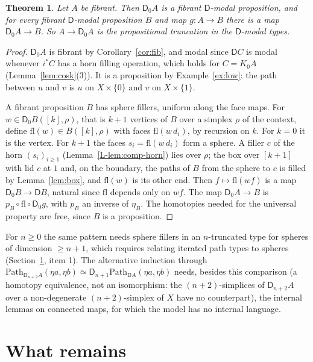 \documentclass[11pt]{article}
\newcommand{\Path}{\mathrm{Path}}
\newcommand{\D}{\mathsf{D}}
\theoremstyle{plain}
\newtheorem{theorem}{Theorem}[section]
\theoremstyle{definition}
\theoremstyle{remark}
\begin{document}
\begin{theorem}\label{thm:prop}
Let $A$ be fibrant. Then $\D_0A$ is a fibrant $\D$-modal proposition, and
for every fibrant $\D$-modal proposition $B$ and map $g:A\to B$ there is a
map $\D_0A\to B$. So $A\to\D_0A$ is the propositional truncation in the
$\D$-modal types.
\end{theorem}

\begin{proof}
$\D_0A$ is fibrant by Corollary~\ref{cor:fib}, and modal since $\D C$ is
modal whenever $i^*C$ has a horn filling operation, which holds for
$C=K_0A$ (Lemma~\ref{lem:cosk}(3)). It is a proposition by
Example~\ref{ex:low}: the path between $u$ and $v$ is $u$ on $X\times\{0\}$
and $v$ on $X\times\{1\}$.

A fibrant proposition $B$ has sphere fillers, uniform along the face maps.
For $w\in\D_0B([k],\rho)$, that is $k+1$ vertices of $B$ over a simplex
$\rho$ of the context, define $\mathrm{fl}(w)\in B([k],\rho)$ with faces
$\mathrm{fl}(w\,d_i)$, by recursion on $k$. For $k=0$ it is the vertex. For
$k+1$ the faces $s_i=\mathrm{fl}(w\,d_i)$ form a sphere. A filler $c$ of the
horn $(s_i)_{i\ge1}$ (Lemma~\ref{L-lem:comp-horn}) lies over $\rho$; the box
over $[k+1]$ with lid $c$ at $1$ and, on the boundary, the paths of $B$
from the sphere to $c$ is filled by Lemma~\ref{lem:box}, and
$\mathrm{fl}(w)$ is its other end. Then $f\mapsto\mathrm{fl}(w f)$ is a map
$\D_0B\to\D B$, natural since $\mathrm{fl}$ depends only on $w f$. The map
$\D_0A\to B$ is $p_B\circ\mathrm{fl}\circ\D_0 g$, with $p_B$ an inverse of
$\eta_B$. The homotopies needed for the universal property are free,
since $B$ is a proposition.
\end{proof}

For $n\ge0$ the same pattern needs sphere fillers in an $n$-truncated type
for spheres of dimension $\ge n+1$, which requires relating iterated path
types to spheres (Section~\ref{sec:remains}, item 1). The alternative
induction through $\Path_{\D_{n+2}A}(\eta a,\eta b)\simeq\D_{n+1}\Path_{\D
A}(\eta a,\eta b)$ needs, besides this comparison (a homotopy equivalence,
not an isomorphism: the $(n+2)$-simplices of $\D_{n+2}A$ over a
non-degenerate $(n+2)$-simplex of $X$ have no counterpart), the internal
lemmas on connected maps, for which the model has no internal language.

\section{What remains}\label{sec:remains}
\end{document}
